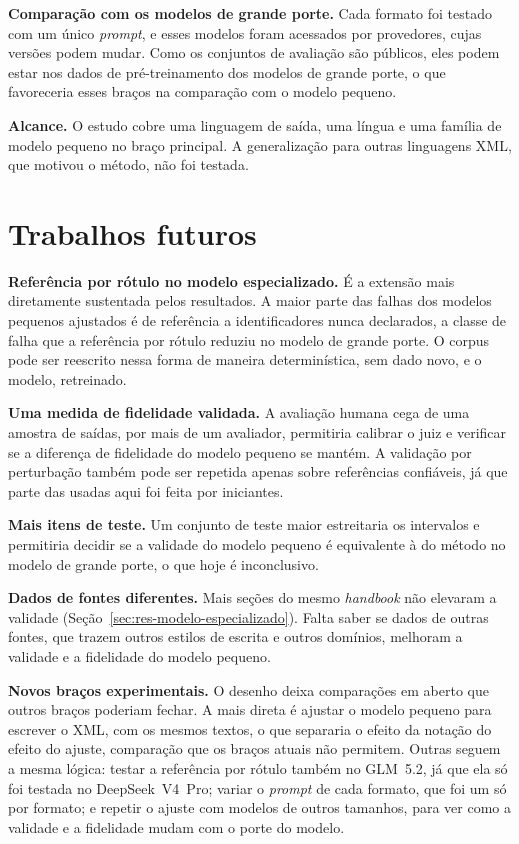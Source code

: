 \textbf{Comparação com os modelos de grande porte.} Cada formato foi testado com um único \textit{prompt}, e esses modelos foram acessados por provedores, cujas versões podem mudar. Como os conjuntos de avaliação são públicos, eles podem estar nos dados de pré-treinamento dos modelos de grande porte, o que favoreceria esses braços na comparação com o modelo pequeno.

\textbf{Alcance.} O estudo cobre uma linguagem de saída, uma língua e uma família de modelo pequeno no braço principal. A generalização para outras linguagens XML, que motivou o método, não foi testada.

\section{Trabalhos futuros}\label{sec:trabalhos-futuros}

\textbf{Referência por rótulo no modelo especializado.} É a extensão mais diretamente sustentada pelos resultados. A maior parte das falhas dos modelos pequenos ajustados é de referência a identificadores nunca declarados, a classe de falha que a referência por rótulo reduziu no modelo de grande porte. O corpus pode ser reescrito nessa forma de maneira determinística, sem dado novo, e o modelo, retreinado.

\textbf{Uma medida de fidelidade validada.} A avaliação humana cega de uma amostra de saídas, por mais de um avaliador, permitiria calibrar o juiz e verificar se a diferença de fidelidade do modelo pequeno se mantém. A validação por perturbação também pode ser repetida apenas sobre referências confiáveis, já que parte das usadas aqui foi feita por iniciantes.

\textbf{Mais itens de teste.} Um conjunto de teste maior estreitaria os intervalos e permitiria decidir se a validade do modelo pequeno é equivalente à do método no modelo de grande porte, o que hoje é inconclusivo.

\textbf{Dados de fontes diferentes.} Mais seções do mesmo \textit{handbook} não elevaram a validade (Seção~\ref{sec:res-modelo-especializado}). Falta saber se dados de outras fontes, que trazem outros estilos de escrita e outros domínios, melhoram a validade e a fidelidade do modelo pequeno.

\textbf{Novos braços experimentais.} O desenho deixa comparações em aberto que outros braços poderiam fechar. A mais direta é ajustar o modelo pequeno para escrever o XML, com os mesmos textos, o que separaria o efeito da notação do efeito do ajuste, comparação que os braços atuais não permitem. Outras seguem a mesma lógica: testar a referência por rótulo também no GLM~5.2, já que ela só foi testada no DeepSeek~V4~Pro; variar o \textit{prompt} de cada formato, que foi um só por formato; e repetir o ajuste com modelos de outros tamanhos, para ver como a validade e a fidelidade mudam com o porte do modelo.

